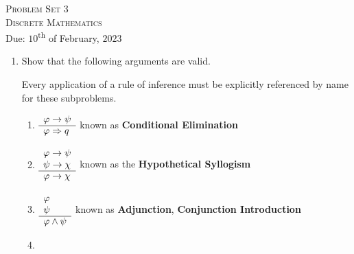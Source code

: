 




\begin{center}
    \textsc{\huge Problem Set 3}\\
    \textsc{Discrete Mathematics}\\
    {\color{gruvred}Due: $10$\textsuperscript{th} of February, $2023$}
\end{center}

\begin{enumerate}
    \item
        Show that the following arguments are valid.
        \begin{remark}
            Every application of a rule of inference must be explicitly referenced by name for these subproblems.
        \end{remark}
        \begin{enumerate}
            \item
                \(
                    \begin{array}{l}
                        \varphi \rightarrow \psi \\
                        \cline{1-1}
                        \varphi \implies q
                    \end{array}
                \)
                \hfill known as \textbf{Conditional Elimination}
            \item
                \(
                    \begin{array}{l}
                        \varphi \rightarrow \psi \\
                        \psi \rightarrow \chi \\
                        \cline{1-1}
                        \varphi \rightarrow \chi
                    \end{array}
                \)
                \hfill known as the \textbf{Hypothetical Syllogism}
            \item
                \(
                    \begin{array}{l}
                        \varphi \\
                        \psi \\
                        \cline{1-1}
                        \varphi \meet \psi
                    \end{array}
                \)
                \hfill known as \textbf{Adjunction}, \aka \textbf{Conjunction Introduction}
            \item

\end{enumerate}
\end{enumerate}

